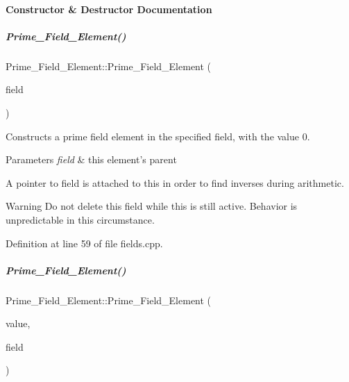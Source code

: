 \paragraph{Constructor \& Destructor Documentation}
\mbox{\label{group___fields_group_ac4a46053696a327bc62038e1cf92c20a}} 
\subparagraph{\texorpdfstring{Prime\+\_\+\+Field\+\_\+\+Element()}{Prime\_Field\_Element()}\hspace{0.1cm}{\footnotesize\ttfamily [1/2]}}
{\footnotesize\ttfamily Prime\+\_\+\+Field\+\_\+\+Element\+::\+Prime\+\_\+\+Field\+\_\+\+Element (\begin{DoxyParamCaption}\item[{const \hyperlink{group___fields_group_class_prime___field}{Prime\+\_\+\+Field} $\ast$}]{field }\end{DoxyParamCaption})\hspace{0.3cm}{\ttfamily [explicit]}}



Constructs a prime field element in the specified field, with the value 0. 


\begin{DoxyParams}{Parameters}
{\em field} & this element's parent\\
\hline
\end{DoxyParams}
A pointer to {\ttfamily field} is attached to {\ttfamily this} in order to find inverses during arithmetic. \begin{DoxyWarning}{Warning}
Do not delete this field while {\ttfamily this} is still active. Behavior is unpredictable in this circumstance. 
\end{DoxyWarning}


Definition at line 59 of file fields.\+cpp.

\mbox{\label{group___fields_group_a0bad5ba05aadbaf14876b2590e300861}} 
\subparagraph{\texorpdfstring{Prime\+\_\+\+Field\+\_\+\+Element()}{Prime\_Field\_Element()}\hspace{0.1cm}{\footnotesize\ttfamily [2/2]}}
{\footnotesize\ttfamily Prime\+\_\+\+Field\+\_\+\+Element\+::\+Prime\+\_\+\+Field\+\_\+\+Element (\begin{DoxyParamCaption}\item[{C\+O\+E\+F\+\_\+\+T\+Y\+PE}]{value,  }\item[{const \hyperlink{group___fields_group_class_prime___field}{Prime\+\_\+\+Field} $\ast$}]{field }\end{DoxyParamCaption})}



